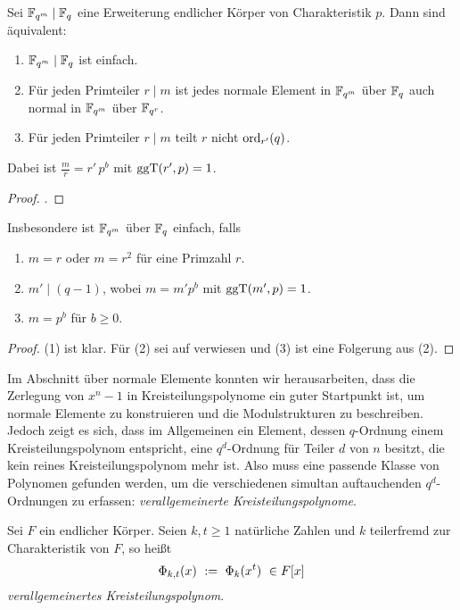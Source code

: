 \begin{satz}
  \label{satz:einfache_erweiterungen}
  Sei $\mathbb{F}_{q^m} \mid \mathbb{F}_q$ eine Erweiterung endlicher Körper
  von Charakteristik $p$. Dann sind äquivalent:
  \begin{enumerate}
    \item $\mathbb{F}_{q^m} \mid \mathbb{F}_q$ ist einfach.
    \item Für jeden Primteiler $r \mid m$ ist jedes normale Element in 
      $\mathbb{F}_{q^m}$ über $\mathbb{F}_q$ auch normal in $\mathbb{F}_{q^m}$ über $\mathbb{F}_{q^r}$.
    \item Für jeden Primteiler $r \mid m$ teilt $r$ nicht
      $\operatorname{ord}_{r'}(q)$.
  \end{enumerate}
  Dabei ist $\tfrac m r = r'\,p^b$ mit $\operatorname{ggT}(r',p) = 1$.
\end{satz}
\begin{proof}
  \autocite[Corollary 15.8]{hachenberger1997finite}.
\end{proof}

\begin{kor}
  \label{kor:einfache_erweiterungen}
  Insbesondere ist $\mathbb{F}_{q^m}$ über $\mathbb{F}_q$ einfach, falls
  \begin{enumerate}
    \item $m = r$ oder $m=r^2$ für eine Primzahl $r$.
    \item $m' \mid (q-1)$, wobei $m=m'p^b$ mit $\operatorname{ggT}(m',p) = 1$.
    \item $m = p^b$ für $b\geq 0$.
  \end{enumerate}
\end{kor}
\begin{proof}
  (1) ist klar. Für (2) sei auf \autocite[Theorem 15.9]{hachenberger1997finite}
  verwiesen und (3) ist eine Folgerung aus (2).
\end{proof}

Im Abschnitt über normale Elemente konnten wir herausarbeiten, dass die
Zerlegung von $x^n-1$ in Kreisteilungspolynome ein guter Startpunkt ist, um
normale Elemente zu konstruieren und die Modulstrukturen zu beschreiben. Jedoch
zeigt es sich, dass im Allgemeinen ein Element, dessen $q$-Ordnung einem
Kreisteilungspolynom entspricht, eine $q^d$-Ordnung für Teiler $d$ von
$n$ besitzt, die kein reines Kreisteilungspolynom mehr ist. 
Also muss eine passende Klasse von Polynomen gefunden werden, um die
verschiedenen simultan auftauchenden $q^d$-Ordnungen zu erfassen: 
\emph{verallgemeinerte Kreisteilungspolynome}.

\begin{definition}
  Sei $F$ ein endlicher Körper. Seien $k,t\geq 1$ natürliche Zahlen und 
  $k$ teilerfremd zur Charakteristik von $F$, so heißt
  \[ \Phi_{k,t}(x) \ :=\  \Phi_k(x^t) \ \in F[x]\]
  \emph{verallgemeinertes Kreisteilungspolynom}.
\end{definition}


